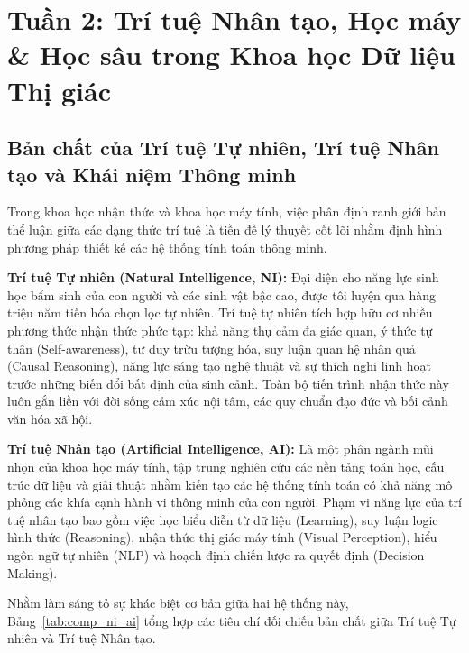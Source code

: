 \section{Tuần 2: Trí tuệ Nhân tạo, Học máy \& Học sâu trong Khoa học Dữ liệu Thị giác}
\label{sec:week2}

\subsection{Bản chất của Trí tuệ Tự nhiên, Trí tuệ Nhân tạo và Khái niệm Thông minh}

Trong khoa học nhận thức và khoa học máy tính, việc phân định ranh giới bản thể luận giữa các dạng thức trí tuệ là tiền đề lý thuyết cốt lõi nhằm định hình phương pháp thiết kế các hệ thống tính toán thông minh.

\textbf{Trí tuệ Tự nhiên (Natural Intelligence, NI):} Đại diện cho năng lực sinh học bẩm sinh của con người và các sinh vật bậc cao, được tôi luyện qua hàng triệu năm tiến hóa chọn lọc tự nhiên. Trí tuệ tự nhiên tích hợp hữu cơ nhiều phương thức nhận thức phức tạp: khả năng thụ cảm đa giác quan, ý thức tự thân (Self-awareness), tư duy trừu tượng hóa, suy luận quan hệ nhân quả (Causal Reasoning), năng lực sáng tạo nghệ thuật và sự thích nghi linh hoạt trước những biến đổi bất định của sinh cảnh. Toàn bộ tiến trình nhận thức này luôn gắn liền với đời sống cảm xúc nội tâm, các quy chuẩn đạo đức và bối cảnh văn hóa xã hội.

\textbf{Trí tuệ Nhân tạo (Artificial Intelligence, AI):} Là một phân ngành mũi nhọn của khoa học máy tính, tập trung nghiên cứu các nền tảng toán học, cấu trúc dữ liệu và giải thuật nhằm kiến tạo các hệ thống tính toán có khả năng mô phỏng các khía cạnh hành vi thông minh của con người. Phạm vi năng lực của trí tuệ nhân tạo bao gồm việc học biểu diễn từ dữ liệu (Learning), suy luận logic hình thức (Reasoning), nhận thức thị giác máy tính (Visual Perception), hiểu ngôn ngữ tự nhiên (NLP) và hoạch định chiến lược ra quyết định (Decision Making).

Nhằm làm sáng tỏ sự khác biệt cơ bản giữa hai hệ thống này, Bảng~\ref{tab:comp_ni_ai} tổng hợp các tiêu chí đối chiếu bản chất giữa Trí tuệ Tự nhiên và Trí tuệ Nhân tạo.

